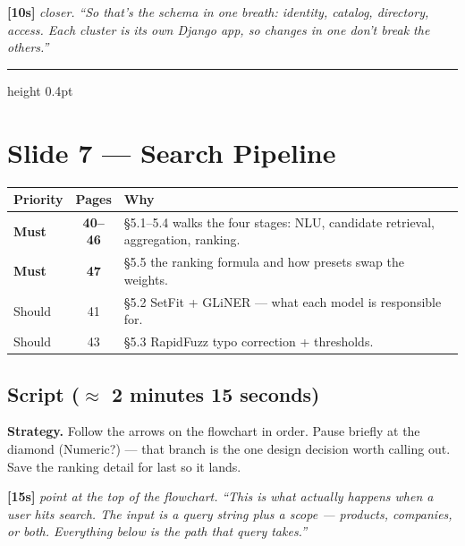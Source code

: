 \documentclass[11pt,a4paper]{article}
\newcommand{\beat}[1]{\textcolor{accent}{\textbf{[#1]}}}
\newcommand{\stage}[1]{{\itshape\color{stageborder}#1}}
\begin{document}
\beat{10s} \stage{closer.}
\textit{``So that's the schema in one breath: identity, catalog, directory, access. Each cluster is its own Django app, so changes in one don't break the others.''}

\hrule height 0.4pt
\vspace{0.5em}

\section{Slide 7 --- Search Pipeline}

\begin{readbox}
\begin{tabularx}{\linewidth}{l c X}
\toprule
\textbf{Priority} & \textbf{Pages} & \textbf{Why} \\
\midrule
\textbf{Must}     & \textbf{40--46} & \S5.1--5.4 walks the four stages: NLU, candidate retrieval, aggregation, ranking. \\
\textbf{Must}     & \textbf{47}     & \S5.5 the ranking formula and how presets swap the weights. \\
Should            & 41              & \S5.2 SetFit + GLiNER --- what each model is responsible for. \\
Should            & 43              & \S5.3 RapidFuzz typo correction + thresholds. \\
\bottomrule
\end{tabularx}
\end{readbox}

\subsection*{Script ($\approx$ 2 minutes 15 seconds)}

\begin{stagebox}
\textbf{Strategy.} Follow the arrows on the flowchart in order. Pause briefly at the diamond (Numeric?) --- that branch is the one design decision worth calling out. Save the ranking detail for last so it lands.
\end{stagebox}

\beat{15s} \stage{point at the top of the flowchart.}
\textit{``This is what actually happens when a user hits search. The input is a query string plus a scope --- products, companies, or both. Everything below is the path that query takes.''}
\end{document}
